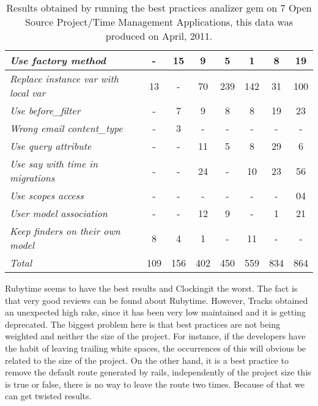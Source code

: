 \documentclass[sle]{llncs}
\begin{document}
\begin{table}[H]
\begin{center}
{\begin{threeparttable}
\begin{tabular}{|l||c|c|c|c|c|c|c|}
\emph{Use factory method                    }              &   -  &  15  &   9  &   5 &   1 &   8 &  19  \\ \hline 
\emph{Replace instance var with local var   }              &  13  &   -  &  70  & 239 & 142 &  31 & 100  \\ \hline 
\emph{Use before\_filter                    }              &   -  &   7  &   9  &   8 &   8 &  19 &  23  \\ \hline 
\emph{Wrong email content\_type             }              &   -  &   3  &   -  &   - &   - &   - &   -  \\ \hline 
\emph{Use query attribute                   }              &   -  &   -  &  11  &   5 &   8 &  29 &   6  \\ \hline 
\emph{Use say with time in migrations       }              &   -  &   -  &  24  &   - &  10 &  23 &  56  \\ \hline 
\emph{Use scopes access                     }              &   -  &   -  &   -  &   - &   - &   - &  04  \\ \hline  
\emph{User model association                }              &   -  &   -  &  12  &   9 &   - &   1 &  21  \\ \hline  
\emph{Keep finders on their own model       }              &   8  &   4  &   1  &   - &  11 &   - &   -  \\ \hline  
\emph{Total                                 }              & 109  & 156  & 402  & 450 & 559 & 834 & 864  \\ \hline 
\end{tabular}
\end{threeparttable}
}
\end{center}
\caption{Results obtained by running the best practices analizer gem on 7 Open Source Project/Time Management Applications, this data was produced on April, 2011.}
\label{table:OSPHWebSites}
\end{table}

Rubytime seems to have the best results and Clockingit the worst. The fact is that very good reviews can be found about Rubytime.
However, Tracks obtained an unexpected high rake, since it has been very low maintained and it is getting deprecated.
The biggest problem here is that best practices are not being weighted and neither the size of the project. 
For instance, if the developers have the habit of leaving trailing white spaces, the occurrences of this will obvious be related to the size of the project.
On the other hand, it is a best practice to remove the default route generated by rails, independently of the project size this is true or false, 
there is no way to leave the route two times. Because of that we can get twisted results.
\end{document}
